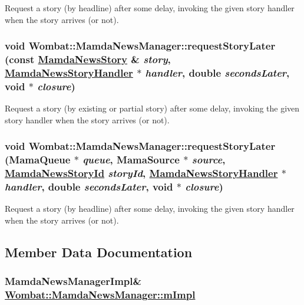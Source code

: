 Request a story (by headline) after some delay, invoking the given story handler when the story arrives (or not). 

\hypertarget{classWombat_1_1MamdaNewsManager_ee0f08106c9f680336cd65b197895d24}{
\subsubsection[requestStoryLater]{\setlength{\rightskip}{0pt plus 5cm}void Wombat::Mamda\-News\-Manager::request\-Story\-Later (const \hyperlink{classWombat_1_1MamdaNewsStory}{Mamda\-News\-Story} \& {\em story}, \hyperlink{classWombat_1_1MamdaNewsStoryHandler}{Mamda\-News\-Story\-Handler} $\ast$ {\em handler}, double {\em seconds\-Later}, void $\ast$ {\em closure})}}
\label{classWombat_1_1MamdaNewsManager_ee0f08106c9f680336cd65b197895d24}


Request a story (by existing or partial story) after some delay, invoking the given story handler when the story arrives (or not). 

\hypertarget{classWombat_1_1MamdaNewsManager_c1db582ac31de14ac5a9984311331dd3}{
\subsubsection[requestStoryLater]{\setlength{\rightskip}{0pt plus 5cm}void Wombat::Mamda\-News\-Manager::request\-Story\-Later (Mama\-Queue $\ast$ {\em queue}, Mama\-Source $\ast$ {\em source}, \hyperlink{namespaceWombat_f7b94f4bb44eb78420c0d3ba0413424e}{Mamda\-News\-Story\-Id} {\em story\-Id}, \hyperlink{classWombat_1_1MamdaNewsStoryHandler}{Mamda\-News\-Story\-Handler} $\ast$ {\em handler}, double {\em seconds\-Later}, void $\ast$ {\em closure})}}
\label{classWombat_1_1MamdaNewsManager_c1db582ac31de14ac5a9984311331dd3}


Request a story (by headline) after some delay, invoking the given story handler when the story arrives (or not). 



\subsection{Member Data Documentation}
\hypertarget{classWombat_1_1MamdaNewsManager_571ea69d4f3d3c8372b601ae4299e580}{
\subsubsection[mImpl]{\setlength{\rightskip}{0pt plus 5cm}Mamda\-News\-Manager\-Impl\& \hyperlink{classWombat_1_1MamdaNewsManager_571ea69d4f3d3c8372b601ae4299e580}{Wombat::Mamda\-News\-Manager::m\-Impl}}}
\label{classWombat_1_1MamdaNewsManager_571ea69d4f3d3c8372b601ae4299e580}


